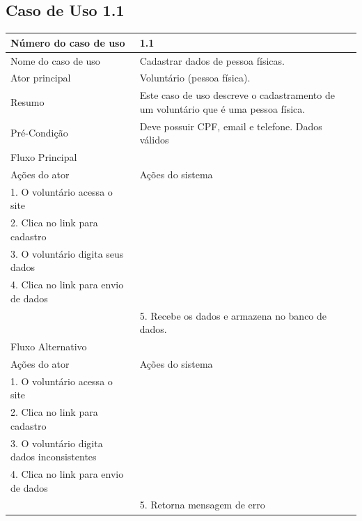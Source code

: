   \subsection{Caso de Uso 1.1}
    \begin{table}[h]
    \begin{center}
    \begin{tabular}{|p{5cm}|p{10cm}|}
      \hline
      Número do caso de uso & 1.1\\
      \hline
      Nome do caso de uso & Cadastrar dados de pessoa físicas.\\
      \hline
      Ator principal & Voluntário (pessoa física).\\
      \hline
      Resumo & Este caso de uso descreve o cadastramento de um voluntário que é uma pessoa física.\\
      \hline
      Pré-Condição & Deve possuir CPF, email e telefone. Dados válidos\\
      \hline
      Fluxo Principal & \\
      \hline
      Ações do ator & Ações do sistema\\
      \hline
      1. O voluntário acessa o site & \\
      \hline   
      2. Clica no link para cadastro & \\
      \hline
      3. O voluntário digita seus dados & \\
      \hline
      4. Clica no link para envio de dados & \\
      \hline
      & 5. Recebe os dados e armazena no banco de dados.\\
      \hline
      Fluxo Alternativo & \\
      \hline
      Ações do ator & Ações do sistema\\
      \hline
      1. O voluntário acessa o site & \\
      \hline   
      2. Clica no link para cadastro & \\
      \hline
      3. O voluntário digita dados inconsistentes & \\
      \hline
      4. Clica no link para envio de dados & \\
      \hline
      & 5. Retorna mensagem de erro \\
      \hline
    \end{tabular}
    \end{center}
    \end{table}
\newpage


